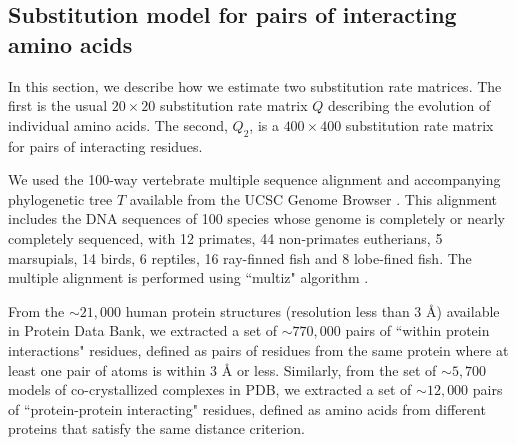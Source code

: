 
\subsection{Substitution model for pairs of interacting amino acids \label{sec:gwasQ2}}

In this section, we describe how we estimate two substitution rate matrices. The first is the usual $20 \times 20$ substitution rate matrix $Q$ describing the evolution of individual amino acids. The second, $Q_2$, is a $400 \times 400$ substitution rate matrix for pairs of interacting residues. 

We used the 100-way vertebrate multiple sequence alignment and accompanying phylogenetic tree $T$ available from the UCSC Genome Browser \cite{karolchik2014ucsc}. This alignment includes the DNA sequences of 100 species whose genome is completely or nearly completely sequenced, with 12 primates, 44 non-primates eutherians, 5 marsupials, 14 birds, 6 reptiles, 16 ray-finned fish and 8 lobe-fined fish.
The multiple alignment is performed using ``multiz" algorithm \cite{blanchette2004aligning,kielbasa2011adaptive}.

From the $\sim 21,000$ human protein structures (resolution less than $3$ \r{A}) available in Protein Data Bank, we extracted a set of $\sim770,000$ pairs of ``within protein interactions" residues, defined as pairs of residues from the same protein where at least one pair of atoms is within $3$ \r{A}  or less. Similarly, from the set of $\sim5,700$ models of co-crystallized complexes in PDB, we extracted a set of $\sim12,000$ pairs of ``protein-protein interacting" residues, defined as amino acids from different proteins that satisfy the same distance criterion.

